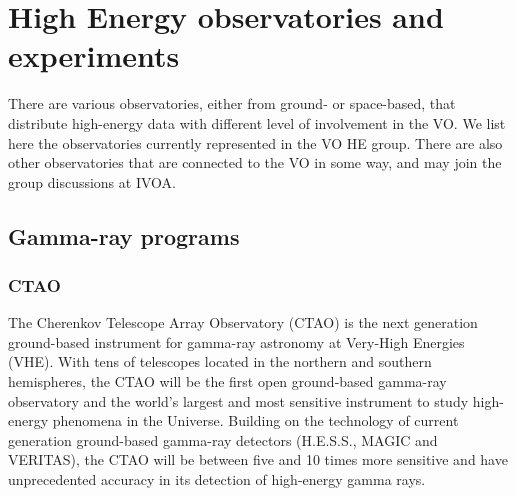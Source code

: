 \documentclass[11pt,a4paper]{ivoa}
\begin{document}





\section{High Energy observatories and experiments}

There are various observatories, either from ground- or space-based, that distribute high-energy data with different level of involvement in the VO. We list here the observatories currently represented in the VO HE group. There are also other observatories that are connected to the VO in some way, and may join the group discussions at IVOA.


\subsection{Gamma-ray programs}

\subsubsection{CTAO}

The Cherenkov Telescope Array Observatory (CTAO) is the next generation ground-based instrument for gamma-ray astronomy at Very-High Energies (VHE). With tens of telescopes located in the northern and southern hemispheres, the CTAO will be the first open ground-based gamma-ray observatory and the world’s largest and most sensitive instrument to study high-energy phenomena in the Universe.
Building on the technology of current generation ground-based gamma-ray detectors (H.E.S.S., MAGIC and VERITAS), the CTAO will be between five and 10 times more sensitive and have unprecedented accuracy in its detection of high-energy gamma rays.
\end{document}

